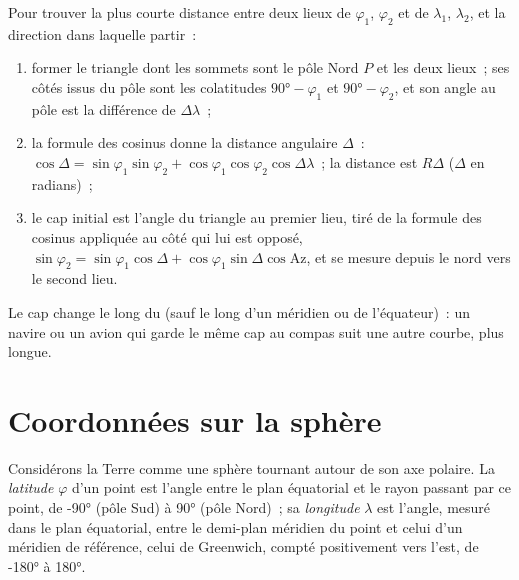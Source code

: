 \begin{method}\label{met:b1:spherical-astronomy:great-circle}
Pour trouver la plus courte distance entre deux lieux de  $\varphi_1$,
$\varphi_2$ et de  $\lambda_1$, $\lambda_2$, et la direction dans
laquelle partir~:
\begin{enumerate}
  \item former le triangle dont les sommets sont le pôle Nord $P$ et les deux
        lieux~; ses côtés issus du pôle sont les colatitudes $\ang{90} -
        \varphi_1$ et $\ang{90} - \varphi_2$, et son angle au pôle est
        la différence de  $\Delta\lambda$~;
  \item la formule des cosinus donne la distance angulaire $\Delta$~:
        $\cos\Delta = \sin\varphi_1\sin\varphi_2 +
        \cos\varphi_1\cos\varphi_2\cos\Delta\lambda$~; la distance est
        $R\Delta$ ($\Delta$ en radians)~;
  \item le cap initial est l'angle du triangle au premier lieu, tiré de la
        formule des cosinus appliquée au côté qui lui est opposé,
        $\sin\varphi_2 = \sin\varphi_1\cos\Delta + \cos\varphi_1\sin\Delta\cos
        \mathrm{Az}$, et se mesure depuis le nord vers le second lieu.
\end{enumerate}
Le cap change le long du  (sauf le long d'un méridien ou de
l'équateur)~: un navire ou un avion qui garde le même cap au compas suit une
autre courbe, plus longue.
\end{method}

\section{Coordonnées sur la sphère}

\begin{definition}\label{def:b1:spherical-astronomy:geographic}
Considérons la Terre comme une sphère tournant autour de son axe polaire. La
\emph{latitude} $\varphi$ d'un point est l'angle entre
le plan équatorial et le rayon passant par ce point, de \ang{-90}
(pôle Sud) à \ang{+90} (pôle Nord)~; sa \emph{longitude}
$\lambda$ est l'angle, mesuré dans le plan équatorial, entre le demi-plan
méridien du point et celui d'un méridien de référence, celui de Greenwich,
compté positivement vers l'est, de \ang{-180} à
\ang{180}.
\end{definition}

